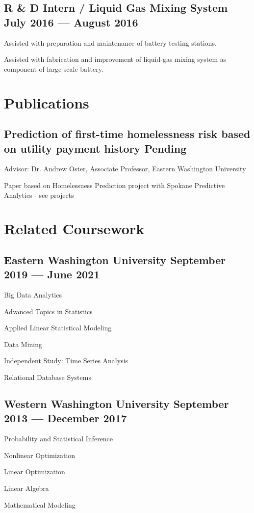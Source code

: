 \documentclass[letter,10pt]{article}
\begin{document}
\newpage
\subsection{{R \& D Intern / Liquid Gas Mixing System \hfill July 2016 --- August 2016}}
\begin{zitemize}
    \item Assisted with preparation and maintenance of battery testing stations.
    \item Assisted with fabrication and improvement of liquid-gas mixing system as component of large scale battery.
\end{zitemize}


\section{Publications}
\subsection{Prediction of first-time homelessness risk based on utility
payment history \hfill Pending}
\begin{zitemize}
    \item Advisor: Dr. Andrew Oster, Associate Professor, Eastern Washington University
    \item Paper based on Homelessness Prediction project with Spokane Predictive Analytics - see projects
\end{zitemize}


\section{Related Coursework}
\subsection{{Eastern Washington University \hfill September 2019 --- June 2021}}
\begin{zitemize}
    \item Big Data Analytics
    \item Advanced Topics in Statistics
    \item Applied Linear Statistical Modeling
    \item Data Mining
    \item Independent Study: Time Series Analysis
    \item Relational Database Systems
\end{zitemize}

\subsection{{Western Washington University \hfill September 2013 --- December 2017}}
\begin{zitemize}
    \item Probability and Statistical Inference
    \item Nonlinear Optimization
    \item Linear Optimization
    \item Linear Algebra
    \item Mathematical Modeling
\end{zitemize}
\end{document}
